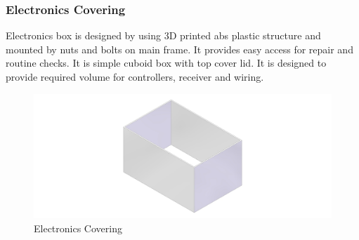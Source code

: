 \subsubsection*{Electronics Covering}
Electronics box is designed by using 3D printed abs plastic structure and mounted by nuts and bolts on main frame. It provides easy access for repair and routine checks. It is simple cuboid box with top cover lid. It is designed to provide required volume for controllers, receiver and wiring.    
\begin{figure}[H]
	\centering
	\includegraphics[width=0.7\linewidth]{../art/elec.jpg}
	\caption{Electronics Covering}
\end{figure}

